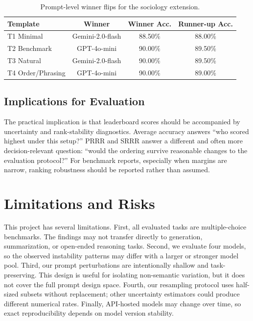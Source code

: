\documentclass[11pt]{article}
\begin{document}
\begin{table}[H]
\centering
\caption{Prompt-level winner flips for the sociology extension.}
\label{tab:sociology_case}
\begin{tabular}{@{}lccc@{}}
\toprule
\textbf{Template} & \textbf{Winner} & \textbf{Winner Acc.} & \textbf{Runner-up Acc.} \\
\midrule
T1 Minimal & Gemini-2.0-flash & 88.50\% & 88.00\% \\
T2 Benchmark & GPT-4o-mini & 90.00\% & 89.50\% \\
T3 Natural & Gemini-2.0-flash & 90.00\% & 89.50\% \\
T4 Order/Phrasing & GPT-4o-mini & 90.00\% & 89.00\% \\
\bottomrule
\end{tabular}
\end{table}

\subsection{Implications for Evaluation}

The practical implication is that leaderboard scores should be accompanied by uncertainty and rank-stability diagnostics. Average accuracy answers ``who scored highest under this setup?'' PRRR and SRRR answer a different and often more decision-relevant question: ``would the ordering survive reasonable changes to the evaluation protocol?'' For benchmark reports, especially when margins are narrow, ranking robustness should be reported rather than assumed.

\section{Limitations and Risks}

This project has several limitations. First, all evaluated tasks are multiple-choice benchmarks. The findings may not transfer directly to generation, summarization, or open-ended reasoning tasks. Second, we evaluate four models, so the observed instability patterns may differ with a larger or stronger model pool. Third, our prompt perturbations are intentionally shallow and task-preserving. This design is useful for isolating non-semantic variation, but it does not cover the full prompt design space. Fourth, our resampling protocol uses half-sized subsets without replacement; other uncertainty estimators could produce different numerical rates. Finally, API-hosted models may change over time, so exact reproducibility depends on model version stability.
\end{document}
